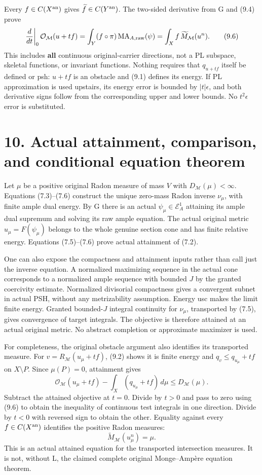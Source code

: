 \documentclass[
  10pt,
]{article}
\begin{document}
Every \(f\in C(X^{\rm an})\) gives \(\widetilde f\in C(Y^{\rm an})\).
The two-sided derivative from G and (9.4) prove \[
 \left.\frac d{dt}\right|_{0}\mathcal O_{\mathcal M}(u+tf)
     =\int_Y(f\circ\pi)\operatorname{MA}_{A,\rm raw}(\psi)
     =\int_X f\,\widetilde M_{\mathcal M}(u^n).
 \tag{9.6}
\] This includes \textbf{all} continuous original-carrier directions,
not a PL subspace, skeletal functions, or invariant functions. Nothing
requires that \(q_{u+tf}\) itself be defined or psh: \(u+tf\) is an
obstacle and (9.1) defines its energy. If PL approximation is used
upstairs, its energy error is bounded by \(|t|\epsilon\), and both
derivative signs follow from the corresponding upper and lower bounds.
No \(t^2\epsilon\) error is substituted.

\section{10. Actual attainment, comparison, and conditional equation
theorem}\label{actual-attainment-comparison-and-conditional-equation-theorem}

Let \(\mu\) be a positive original Radon measure of mass \(V\) with
\(D_{\mathcal M}(\mu)<\infty\). Equations (7.3)--(7.6) construct the
unique zero-mass Radon inverse \(\nu_\mu\), with finite ample dual
energy. By G there is an actual \(\psi_\mu\in\mathcal E^1_A\) attaining
its ample dual supremum and solving its raw ample equation. The actual
original metric \(u_\mu=F(\psi_\mu)\) belongs to the whole genuine
section cone and has finite relative energy. Equations (7.5)--(7.6)
prove actual attainment of (7.2).

One can also expose the compactness and attainment inputs rather than
call just the inverse equation. A normalized maximizing sequence in the
actual cone corresponds to a normalized ample sequence with bounded
\(J\) by the granted coercivity estimate. Normalized divisorial
compactness gives a convergent subnet in actual PSH, without any
metrizability assumption. Energy usc makes the limit finite energy.
Granted bounded-\(J\) integral continuity for \(\nu_\mu\), transported
by (7.5), gives convergence of target integrals. The objective is
therefore attained at an actual original metric. No abstract completion
or approximate maximizer is used.

For completeness, the original obstacle argument also identifies its
transported measure. For \(v=R_{\mathcal M}(u_\mu+tf)\), (9.2) shows it
is finite energy and \(q_v\leq q_{u_\mu}+tf\) on \(X\setminus P\). Since
\(\mu(P)=0\), attainment gives \[
 \mathcal O_{\mathcal M}(u_\mu+tf)-\int_X(q_{u_\mu}+tf)\,d\mu
       \leq D_{\mathcal M}(\mu).
\] Subtract the attained objective at \(t=0\). Divide by \(t>0\) and
pass to zero using (9.6) to obtain the inequality of continuous test
integrals in one direction. Divide by \(t<0\) with reversed sign to
obtain the other. Equality against every \(f\in C(X^{\rm an})\)
identifies the positive Radon measures: \[
 \widetilde M_{\mathcal M}(u_\mu^n)=\mu.
 \tag{10.1}
\] This is an actual attained equation for the transported intersection
measures. It is not, without L, the claimed complete original
Monge--Ampère equation theorem.
\end{document}
